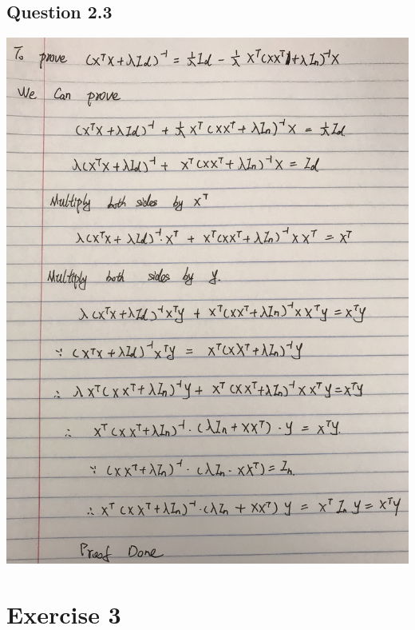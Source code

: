 \documentclass[11pt]{article} %
\begin{document}
\subsection{Question 2.3}
\includegraphics[scale = 0.15]{e23.jpeg}

\section{Exercise 3}
\end{document}
